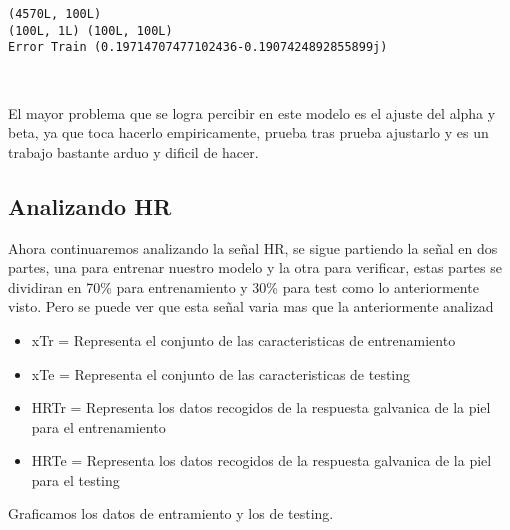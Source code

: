 \documentclass[11pt]{article}
\providecommand{\tightlist}{%
      \setlength{\itemsep}{0pt}\setlength{\parskip}{0pt}}
\begin{document}
    \begin{Verbatim}[commandchars=\\\{\}]
(4570L, 100L)
(100L, 1L) (100L, 100L)
Error Train (0.19714707477102436-0.1907424892855899j)

    \end{Verbatim}

    \begin{center}
    \end{center}
    { \hspace*{\fill} \\}
    
    El mayor problema que se logra percibir en este modelo es el ajuste del
alpha y beta, ya que toca hacerlo empiricamente, prueba tras prueba
ajustarlo y es un trabajo bastante arduo y dificil de hacer.

    \subsection{Analizando HR}\label{analizando-hr}

    Ahora continuaremos analizando la señal HR, se sigue partiendo la señal
en dos partes, una para entrenar nuestro modelo y la otra para
verificar, estas partes se dividiran en 70\% para entrenamiento y 30\%
para test como lo anteriormente visto. Pero se puede ver que esta señal
varia mas que la anteriormente analizad

\begin{itemize}
\tightlist
\item
  xTr = Representa el conjunto de las caracteristicas de entrenamiento
\item
  xTe = Representa el conjunto de las caracteristicas de testing
\item
  HRTr = Representa los datos recogidos de la respuesta galvanica de la
  piel para el entrenamiento
\item
  HRTe = Representa los datos recogidos de la respuesta galvanica de la
  piel para el testing
\end{itemize}

Graficamos los datos de entramiento y los de testing.
\end{document}
